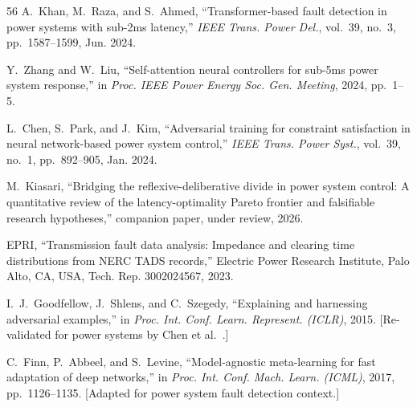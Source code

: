 \documentclass[journal]{IEEEtran}
\begin{document}
\begin{thebibliography}{56}
 A.~Khan, M.~Raza, and S.~Ahmed, ``Transformer-based fault detection in power systems with sub-2ms latency,'' \textit{IEEE Trans. Power Del.}, vol.~39, no.~3, pp.~1587--1599, Jun. 2024.

 Y.~Zhang and W.~Liu, ``Self-attention neural controllers for sub-5ms power system response,'' in \textit{Proc. IEEE Power Energy Soc. Gen. Meeting}, 2024, pp.~1--5.

 L.~Chen, S.~Park, and J.~Kim, ``Adversarial training for constraint satisfaction in neural network-based power system control,'' \textit{IEEE Trans. Power Syst.}, vol.~39, no.~1, pp.~892--905, Jan. 2024.

 M.~Kiasari, ``Bridging the reflexive-deliberative divide in power system control: A quantitative review of the latency-optimality Pareto frontier and falsifiable research hypotheses,'' companion paper, under review, 2026.

 EPRI, ``Transmission fault data analysis: Impedance and clearing time distributions from NERC TADS records,'' Electric Power Research Institute, Palo Alto, CA, USA, Tech. Rep. 3002024567, 2023.

 I.~J.~Goodfellow, J.~Shlens, and C.~Szegedy, ``Explaining and harnessing adversarial examples,'' in \textit{Proc. Int. Conf. Learn. Represent. (ICLR)}, 2015. [Re-validated for power systems by Chen et al.~\cite{ref_chen}.]

 C.~Finn, P.~Abbeel, and S.~Levine, ``Model-agnostic meta-learning for fast adaptation of deep networks,'' in \textit{Proc. Int. Conf. Mach. Learn. (ICML)}, 2017, pp.~1126--1135. [Adapted for power system fault detection context.]

\end{thebibliography}
\end{document}
